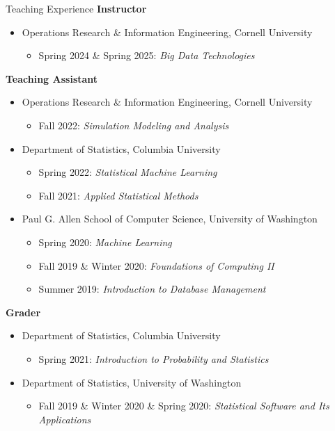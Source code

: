 \documentclass{resume} %
\begin{document}
\begin{rSection}{Teaching Experience}
{\bf Instructor}
\begin{itemize}
	\item Operations Research \& Information Engineering, Cornell University
	\begin{itemize}
		\item Spring 2024 \& Spring 2025: {\em Big Data Technologies}
	\end{itemize}
\end{itemize}
{\bf Teaching Assistant}
\begin{itemize}
	\item Operations Research \& Information Engineering, Cornell University
	\begin{itemize}
		\item Fall 2022: {\em Simulation Modeling and Analysis}
	\end{itemize}
	\item Department of Statistics, Columbia University
	\begin{itemize}
		\item Spring 2022: {\em Statistical Machine Learning}
		\item Fall 2021: {\em Applied Statistical Methods}
	\end{itemize}
	\item Paul G. Allen School of Computer Science, University of Washington
	\begin{itemize}
		\item Spring 2020: {\em Machine Learning}
		\item Fall 2019 \& Winter 2020: {\em Foundations of Computing II}
		\item Summer 2019: {\em Introduction to Database Management}
	\end{itemize}
\end{itemize}
{\bf Grader}
\begin{itemize}
	\item Department of Statistics, Columbia University
	\begin{itemize}
		\item Spring 2021: {\em Introduction to Probability and Statistics}
	\end{itemize}
	\item Department of Statistics, University of Washington
	\begin{itemize}
		\item Fall 2019 \& Winter 2020 \& Spring 2020: {\em Statistical Software and Its Applications}
	\end{itemize}
\end{itemize}
\end{rSection}




\end{document}
